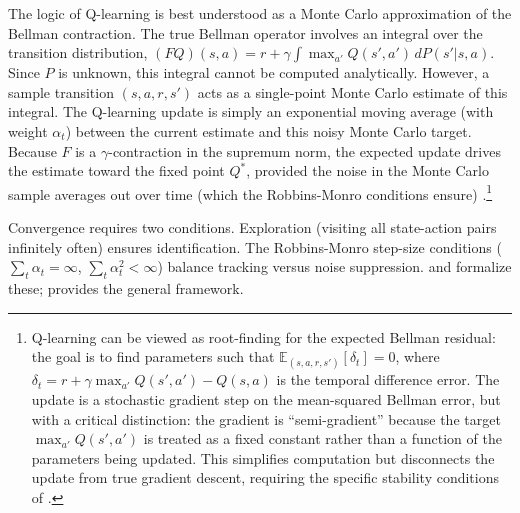 The logic of Q-learning is best understood as a Monte Carlo approximation of the Bellman contraction. The true Bellman operator involves an integral over the transition distribution, $(FQ)(s,a) = r + \gamma \int \max_{a'} Q(s',a') \, dP(s'|s,a)$. Since $P$ is unknown, this integral cannot be computed analytically. However, a sample transition $(s,a,r,s')$ acts as a single-point Monte Carlo estimate of this integral. The Q-learning update is simply an exponential moving average (with weight $\alpha_t$) between the current estimate and this noisy Monte Carlo target. Because $F$ is a $\gamma$-contraction in the supremum norm, the expected update drives the estimate toward the fixed point $Q^*$, provided the noise in the Monte Carlo sample averages out over time (which the Robbins-Monro conditions ensure) \citep{tsitsiklis1994}.\footnote{Q-learning can be viewed as root-finding for the expected Bellman residual: the goal is to find parameters such that $\mathbb{E}_{(s,a,r,s')}[\delta_t] = 0$, where $\delta_t = r + \gamma \max_{a'} Q(s',a') - Q(s,a)$ is the temporal difference error. The update is a stochastic gradient step on the mean-squared Bellman error, but with a critical distinction: the gradient is ``semi-gradient'' because the target $\max_{a'} Q(s',a')$ is treated as a fixed constant rather than a function of the parameters being updated. This simplifies computation but disconnects the update from true gradient descent, requiring the specific stability conditions of \citet{tsitsiklis1994}.}

Convergence requires two conditions. Exploration (visiting all state-action pairs infinitely often) ensures identification. The Robbins-Monro step-size conditions ($\sum_t \alpha_t = \infty$, $\sum_t \alpha_t^2 < \infty$) balance tracking versus noise suppression. \citet{WatkinsDayan1992} and \citet{jaakkola1994} formalize these; \citet{tsitsiklis1994} provides the general framework.


